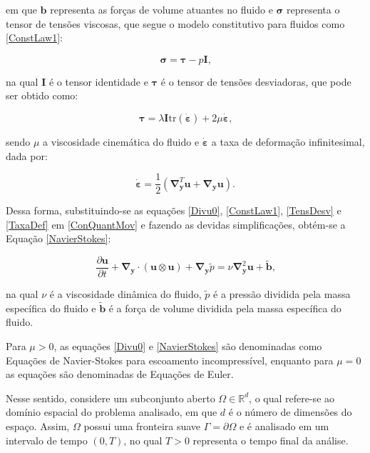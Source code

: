 \documentclass[_ArquivoPrincipal.tex]{subfiles}
\begin{document}
\noindent em que $\mathbf{b}$ representa as forças de volume atuantes no fluido e $\mathbf{\sigma}$ representa o tensor de tensões viscosas, que segue o modelo constitutivo para fluidos como \ref{ConstLaw1}:

\begin{equation}
    \mathbf{\sigma}=\mathbf{\tau}-p\mathbf{I}\text{,}
    \label{ConstLaw1}
\end{equation}

\noindent na qual $\mathbf{I}$ é o tensor identidade e $\mathbf{\tau}$ é o tensor de tensões desviadoras, que pode ser obtido como:

\begin{equation}
    \mathbf{\tau}=\lambda\mathbf{I}\textrm{tr}(\dot{\mathbf{\varepsilon}})+2\mu\dot{\mathbf{\varepsilon}}\text{,}
    \label{TensDesv}
\end{equation}

\noindent sendo $\mu$ a viscosidade cinemática do fluido e $\dot{\mathbf{\varepsilon}}$ a taxa de deformação infinitesimal, dada por:

\begin{equation}
    \dot{\mathbf{\varepsilon}}=\frac{1}{2}\left(\mathbf{\nabla}^T_\mathbf{y}\mathbf{u}+\mathbf{\nabla}_\mathbf{y}\mathbf{u}\right)\text{.}
    \label{TaxaDef}
\end{equation}

Dessa forma, substituindo-se as equações \ref{Divu0}, \ref{ConstLaw1}, \ref{TensDesv} e \ref{TaxaDef} em \ref{ConQuantMov} e fazendo as devidas simplificações, obtém-se a Equação \ref{NavierStokes}:

\begin{equation}
    \frac{\partial\mathbf{u}}{\partial t}+\mathbf{\nabla}_\mathbf{y}\cdot(\mathbf{u}\otimes\mathbf{u})+\mathbf{\nabla}_\mathbf{y}\tilde{p}=\nu\mathbf{\nabla}^2_\mathbf{y}\mathbf{u}+\tilde{\mathbf{b}}\text{,}
    \label{NavierStokes}
\end{equation}

\noindent na qual $\nu$ é a viscosidade dinâmica do fluido, $\tilde{p}$ é a pressão dividida pela massa específica do fluido e $\tilde{\mathbf{b}}$ é a força de volume dividida pela massa específica do fluido.

Para $\mu>0$, as equações \ref{Divu0} e \ref{NavierStokes} são denominadas como Equações de Navier-Stokes para escoamento incompressível, enquanto para $\mu=0$ as equações são denominadas de Equações de Euler.

Nesse sentido, considere um subconjunto aberto $\Omega\in\mathbb{R}^d$, o qual refere-se ao domínio espacial do problema analisado, em que $d$ é o número de dimensões do espaço. Assim, $\Omega$ possui uma fronteira suave $\Gamma=\partial\Omega$ e é analisado em um intervalo de tempo $(0,T)$, no qual $T>0$ representa o tempo final da análise.
\end{document}
